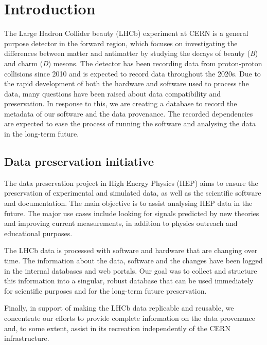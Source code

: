 \section{Introduction}

The Large Hadron Collider beauty (LHCb) experiment at CERN is a general purpose detector in the forward region, which focuses on investigating the differences between matter and antimatter by studying the decays of beauty (\emph{B}) and charm (\emph{D}) mesons. The detector has been recording data from proton-proton collisions since 2010 and is expected to record data throughout the 2020s. Due to the rapid development of both the hardware and software used to process the data, many questions have been raised about data compatibility and preservation. In response to this, we are creating a database to record the metadata of our software and the data provenance. The recorded dependencies are expected to ease the process of running the software and analysing the data in the long-term future.

\subsection {Data preservation initiative}

 The data preservation project in High Energy Physics (HEP) aims to ensure the preservation of experimental and simulated data, as well as the scientific software and documentation. The main objective is to assist analysing HEP data in the future. The major use cases include looking for signals predicted by new theories and improving current measurements, in addition to physics outreach and educational purposes.

The LHCb data is processed with software and hardware that are changing over time. The information about the data, software and the changes have been logged in the internal databases and web portals. Our goal was to collect and structure this information into a singular, robust database that can be used immediately for scientific purposes and for the long-term future preservation. 

Finally, in support of making the LHCb data replicable and reusable, we concentrate our efforts to provide complete information on the data provenance and, to some extent, assist in its recreation independently of the CERN infrastructure.
